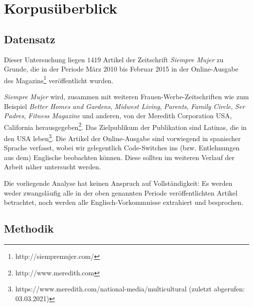 \section{Korpusüberblick}
\label{chap:corpus}


\subsection{Datensatz}

Dieser Untersuchung liegen $1419$ Artikel der Zeitschrift \textit{Siempre Mujer} zu Grunde,
die in der Periode März 2010 bis Februar 2015 in der Online-Ausgabe des Magazins\footnote{http://siempremujer.com/} veröffentlicht wurden.

\textit{Siempre Mujer} wird, zusammen mit weiteren Frauen-Werbe-Zeitschriften wie zum Beispiel \textit{Better Homes and Gardens}, \textit{Midwest Living}, \textit{Parents}, \textit{Family Circle}, \textit{Ser Padres}, \textit{Fitness Magazine} und anderen, von der Meredith Corporation USA, California herausgegeben\footnote{http://www.meredith.com}.
Das Zielpublikum der Publikation sind Latinas, die in den USA leben\footnote{https://www.meredith.com/national-media/multicultural (zuletzt abgerufen: 03.03.2021)}.
Die Artikel der Online-Ausgabe sind vorwiegend in spanischer Sprache verfasst,
wobei wir gelegentlich Code-Switches ins (bzw. Entlehnungen aus dem) Englische beobachten können.
Diese sollten im weiteren Verlauf der Arbeit näher untersucht werden.

Die vorliegende Analyse hat keinen Anspruch auf Vollständigkeit:
Es werden weder zwangsläufig alle in der oben genannten Periode veröffentlichten Artikel betrachtet,
noch werden alle Englisch-Vorkommnisse extrahiert und besprochen.



\subsection{Methodik}

